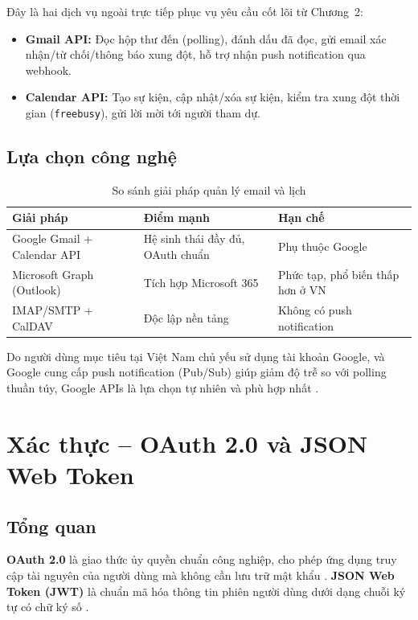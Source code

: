 \documentclass[../DoAn.tex]{subfiles}
\begin{document}
Đây là hai dịch vụ ngoài trực tiếp phục vụ yêu cầu cốt lõi từ Chương~2:
\begin{itemize}
    \item \textbf{Gmail API:} Đọc hộp thư đến (polling), đánh dấu đã đọc, gửi email xác nhận/từ chối/thông báo xung đột, hỗ trợ nhận push notification qua webhook.
    \item \textbf{Calendar API:} Tạo sự kiện, cập nhật/xóa sự kiện, kiểm tra xung đột thời gian (\texttt{freebusy}), gửi lời mời tới người tham dự.
\end{itemize}

\subsection{Lựa chọn công nghệ}

\begin{table}[ht]
\centering
\caption{So sánh giải pháp quản lý email và lịch}
\label{tab:email-calendar-comparison}
\begin{tabular}{|l|l|l|}
\hline
\textbf{Giải pháp} & \textbf{Điểm mạnh} & \textbf{Hạn chế} \\
\hline
Google Gmail + Calendar API & Hệ sinh thái đầy đủ, OAuth chuẩn & Phụ thuộc Google \\
Microsoft Graph (Outlook) & Tích hợp Microsoft 365 & Phức tạp, phổ biến thấp hơn ở VN \\
IMAP/SMTP + CalDAV & Độc lập nền tảng & Không có push notification \\
\hline
\end{tabular}
\end{table}

Do người dùng mục tiêu tại Việt Nam chủ yếu sử dụng tài khoản Google, và Google cung cấp push notification (Pub/Sub) giúp giảm độ trễ so với polling thuần túy, Google APIs là lựa chọn tự nhiên và phù hợp nhất \cite{google2024gmailapi}.

\section{Xác thực -- OAuth 2.0 và JSON Web Token}

\subsection{Tổng quan}

\textbf{OAuth 2.0} là giao thức ủy quyền chuẩn công nghiệp, cho phép ứng dụng truy cập tài nguyên của người dùng mà không cần lưu trữ mật khẩu \cite{ietf2012oauth2}. \textbf{JSON Web Token (JWT)} là chuẩn mã hóa thông tin phiên người dùng dưới dạng chuỗi ký tự có chữ ký số \cite{jones2015jwt}.
\end{document}

